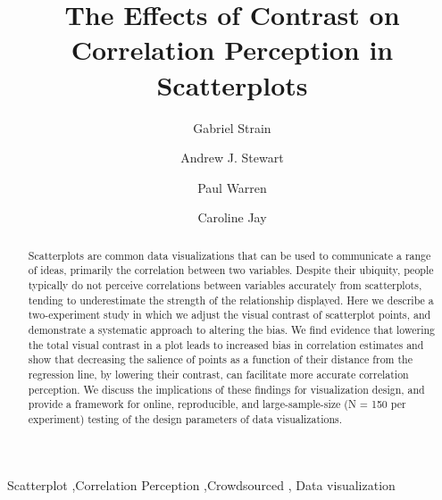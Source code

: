 \documentclass[preprint, 3p,
authoryear]{elsarticle} %
\begin{document}
\begin{frontmatter}

  \title{The Effects of Contrast on Correlation Perception in
Scatterplots}
    \author[CS]{Gabriel Strain%
  }
    \author[CS]{Andrew J. Stewart%
  }
    \author[SSS]{Paul Warren%
  }
    \author[CS]{Caroline Jay%
  }
  
  \begin{abstract}
  Scatterplots are common data visualizations that can be used to
  communicate a range of ideas, primarily the correlation between two
  variables. Despite their ubiquity, people typically do not perceive
  correlations between variables accurately from scatterplots, tending
  to underestimate the strength of the relationship displayed. Here we
  describe a two-experiment study in which we adjust the visual contrast
  of scatterplot points, and demonstrate a systematic approach to
  altering the bias. We find evidence that lowering the total visual
  contrast in a plot leads to increased bias in correlation estimates
  and show that decreasing the salience of points as a function of their
  distance from the regression line, by lowering their contrast, can
  facilitate more accurate correlation perception. We discuss the
  implications of these findings for visualization design, and provide a
  framework for online, reproducible, and large-sample-size (N = 150 per
  experiment) testing of the design parameters of data visualizations.
  \end{abstract}
    \begin{keyword}
    Scatterplot \sep Correlation Perception \sep Crowdsourced \sep 
    Data visualization
  \end{keyword}
  
 \end{frontmatter}
\end{document}

